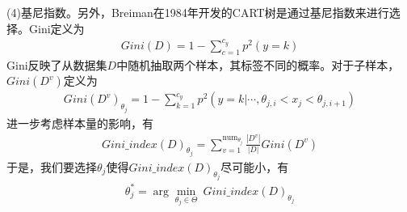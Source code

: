             \par
            (4)基尼指数。另外，Breiman在1984年开发的CART树是通过基尼指数来进行选择。Gini定义为
            \begin{align*}
            Gini(D) = 1-\sum_{c=1}^{c_y}p^2(y=k)
            \end{align*}
            Gini反映了从数据集$D$中随机抽取两个样本，其标签不同的概率。对于子样本，$Gini(D^v)$定义为
            \begin{align*}
            Gini(D^v)_{\theta_j} = 1-\sum_{k=1}^{c_y} p^2(y=k|\cdots,\theta_{j,i}<x_j<\theta_{j,i+1})
            \end{align*}
            进一步考虑样本量的影响，有
            \begin{align*}
            Gini\_index(D)_{\theta_j} = \sum_{v=1}^{\mathrm{num}_{\theta_j}}\frac{|D^v|}{|D|}Gini(D^v)
            \end{align*}
            于是，我们要选择$\theta_j$使得$Gini\_index(D)_{\theta_j} $尽可能小，有
            \begin{align*}
            \theta_j^* = \arg\min_{\theta_j\in \Theta}\ Gini\_index(D)_{\theta_j}
            \end{align*}
